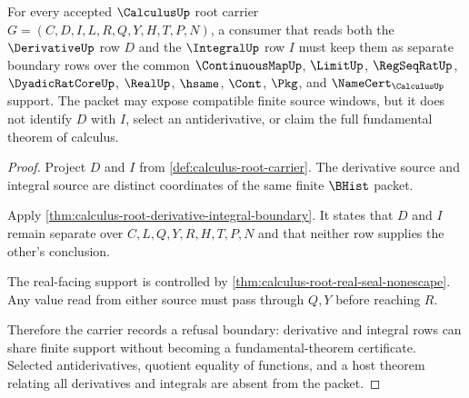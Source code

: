 \begin{theorem}
\label{thm:calculus-root-ftc-boundary-refusal}
For every accepted $\CalculusUp$ root carrier $G=(C,D,I,L,R,Q,Y,H,T,P,N)$, a consumer that reads both the $\DerivativeUp$ row $D$ and the $\IntegralUp$ row $I$ must keep them as separate boundary rows over the common $\ContinuousMapUp$, $\LimitUp$, $\RegSeqRatUp$, $\DyadicRatCoreUp$, $\RealUp$, $\hsame$, $\Cont$, $\Pkg$, and $\NameCert_{\CalculusUp}$ support. The packet may expose compatible finite source windows, but it does not identify $D$ with $I$, select an antiderivative, or claim the full fundamental theorem of calculus.
\end{theorem}
\begin{proof}
Project $D$ and $I$ from \autoref{def:calculus-root-carrier}. The derivative source and integral source are distinct coordinates of the same finite $\BHist$ packet.

Apply \autoref{thm:calculus-root-derivative-integral-boundary}. It states that $D$ and $I$ remain separate over $C,L,Q,Y,R,H,T,P,N$ and that neither row supplies the other's conclusion.

The real-facing support is controlled by \autoref{thm:calculus-root-real-seal-nonescape}. Any value read from either source must pass through $Q,Y$ before reaching $R$.

Therefore the carrier records a refusal boundary: derivative and integral rows can share finite support without becoming a fundamental-theorem certificate. Selected antiderivatives, quotient equality of functions, and a host theorem relating all derivatives and integrals are absent from the packet.
\end{proof}

